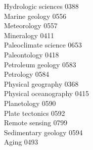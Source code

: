 \documentclass[9pt]{article}
\begin{document}
\begin{multicols}{3}
Hydrologic sciences \hfill 0388 \leavevmode \\
Marine geology \hfill 0556 \leavevmode \\
Meteorology \hfill 0557 \leavevmode \\
Mineralogy \hfill 0411 \leavevmode \\
Paleoclimate science \hfill 0653 \leavevmode \\
Paleontology \hfill 0418 \leavevmode \\
Petroleum geology \hfill 0583 \leavevmode \\
Petrology \hfill 0584 \leavevmode \\
Physical geography \hfill 0368 \leavevmode \\
Physical oceanography \hfill 0415 \leavevmode \\
Planetology \hfill 0590 \leavevmode \\
Plate tectonics \hfill 0592 \leavevmode \\
Remote sensing \hfill 0799 \leavevmode \\
Sedimentary geology \hfill 0594 \leavevmode \\
Aging \hfill 0493


\end{multicols}
\end{document}
